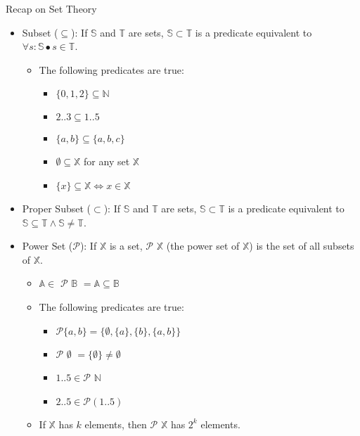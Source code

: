 \documentclass[aspectratio=169]{beamer}
\begin{document}
\begin{frame}{Recap on Set Theory}
    \begin{itemize}
        \item Subset ($\subseteq$): If $\mathbb{S}$ and $\mathbb{T}$ are sets, $\mathbb{S} \subset \mathbb{T}$ is a predicate equivalent to $\forall s : \mathbb{S} \bullet s \in \mathbb{T}$.
        \begin{itemize}
            \item The following predicates are true:
            \begin{itemize}
                \item $\{0, 1, 2\} \subseteq \mathbb{N}$
                \item $2..3 \subseteq 1..5$
                \item $\{a, b\} \subseteq \{a, b, c\}$
                \item $\emptyset \subseteq \mathbb{X}$ for any set $\mathbb{X}$
                \item $\{x\} \subseteq \mathbb{X} \Leftrightarrow x \in \mathbb{X}$
            \end{itemize}
        \end{itemize}
        \item Proper Subset ($\subset$): If $\mathbb{S}$ and $\mathbb{T}$ are sets, $\mathbb{S} \subset \mathbb{T}$ is a predicate equivalent to $\mathbb{S} \subseteq \mathbb{T} \wedge \mathbb{S} \neq \mathbb{T}$.
        \item Power Set ($\mathcal{P}$): If $\mathbb{X}$ is a set, $\mathcal{P}$ $\mathbb{X}$ (the power set of $\mathbb{X}$) is the set of all subsets of $\mathbb{X}$.
        \begin{itemize}
            \item $\mathbb{A} \in$ $\mathcal{P}$ $\mathbb{B}$ $= \mathbb{A} \subseteq \mathbb{B}$ 
            \item The following predicates are true:
            \begin{itemize}
                \item $\mathcal{P}\{a, b\} = \{\emptyset, \{a\}, \{b\}, \{a, b\}\}$
                \item $\mathcal{P}$ $\emptyset$ $= \{\emptyset\} \neq \emptyset$
                \item $1 .. 5 \in \mathcal{P}$ $\mathbb{N}$
                \item $2 .. 5 \in \mathcal{P}(1 .. 5)$
            \end{itemize}
            \item If $\mathbb{X}$ has $k$ elements, then $\mathcal{P}$ $\mathbb{X}$ has $2^{k}$ elements.
        \end{itemize}
    \end{itemize}
\end{frame}
\end{document}
